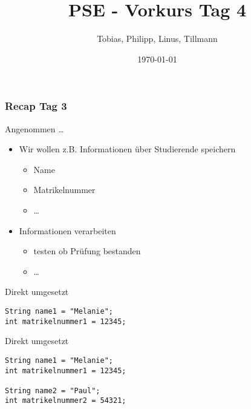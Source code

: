\documentclass{../../presentation}
\title{PSE - Vorkurs Tag 4}
\author{Tobias, Philipp, Linus, Tillmann}
\institute{FIUS - Fachgruppe Informatik Universität Stuttgart}
\date{\today}
\begin{document}
\begin{frame}
	\titlepage
\end{frame}

\begin{frame}
	\listoftodos
\end{frame}

\begin{frame}
	\frametitle{Recap Tag 3}
\end{frame}



\begin{frame}{Angenommen \dots}
	\begin{itemize}
		\item Wir wollen z.B. Informationen über Studierende speichern
		      \begin{itemize}
			      \item<2->[\textbullet] Name
			      \item<3->[\textbullet] Matrikelnummer
			      \item<4->[\textbullet] \dots
		      \end{itemize}
		\item<5-> Informationen verarbeiten
		      \begin{itemize}
			      \item<6->[\textbullet] testen ob Prüfung bestanden
			      \item<7->[\textbullet] \dots
		      \end{itemize}
	\end{itemize}
\end{frame}



\begin{frame}[fragile,t]{Direkt umgesetzt}
	\vspace{2.0em}
	\begin{minipage}[t][0.6\textheight][t]{\textwidth}
		\begin{verbatim}
String name1 = "Melanie";
int matrikelnummer1 = 12345;
\end{verbatim}
	\end{minipage}
\end{frame}



\begin{frame}[fragile,t]{Direkt umgesetzt}
	\vspace{2.0em}
	\begin{minipage}[t][0.6\textheight][t]{\textwidth}
		\begin{verbatim}
String name1 = "Melanie";
int matrikelnummer1 = 12345;

String name2 = "Paul";
int matrikelnummer2 = 54321;
\end{verbatim}
	\end{minipage}
\end{frame}
\end{document}
